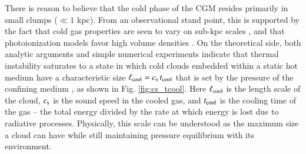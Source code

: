\documentclass[11pt,letterpaper,english]{article}
\begin{document}
There is reason to believe that the cold phase of the CGM resides primarily in small clumps ($\ll 1$ kpc).  From an observational stand point, this is supported by the fact that cold gas properties are seen to vary on sub-kpc scales
 \cite{Rauch02, Churchill03, Lopez18}, and that photoionization models favor high volume densities \cite{Werk14,Lau16}. On the theoretical side, both analytic arguments and simple numerical experiments indicate that thermal instability saturates to a state in which cold clouds embedded within a static hot medium have a characteristic size $\ell_{\rm cool} = c_{\rm s}\, t_{\rm cool}$ that is set by the pressure of the confining medium \cite{McCourt18}, as shown in Fig. \ref{fig:cs_tcool}. Here $\ell_{\rm cool}$ is the length scale of the cloud, $c_{\rm s}$ is the sound speed in the cooled gas, and $t_{\rm cool}$ is the cooling time of the gas -- the total energy divided by the rate at which energy is lost due to radiative processes. Physically, this scale can be understood as the maximum size a cloud can have while still maintaining pressure equilibrium with its environment. 




\end{document}
